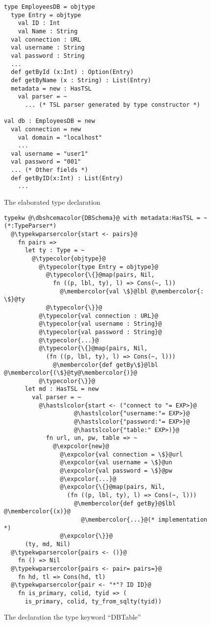 \documentclass{sig-alternate}
\newcommand{\typekwparsercolor}[1]{\textcolor[HTML]{7C803E}{#1}}
\newcommand{\expcolor}[1]{\textcolor[HTML]{FF0033}{#1}}
\newcommand{\membercolor}[1]{\textcolor[HTML]{FF6600}{#1}}
\newcommand{\typecolor}[1]{\textcolor[HTML]{660066}{#1}}
\newcommand{\hastslcolor}[1]{\textcolor[HTML]{002FC9}{#1}}
\newcommand{\dbshcemacolor}[1]{\textcolor[HTML]{5AC3D1}{#1}}
\newcommand{\mycaption}[1]{\vspace{-4px}\caption{#1}\vspace{-2px}}
\begin{document}
\begin{figure}[t]
\begin{lstlisting}[style=wyvern]
type EmployeesDB = objtype
  type Entry = objtype
    val ID : Int
    val Name : String 
  val connection : URL
  val username : String
  val password : String
  ...
  def getById (x:Int) : Option(Entry)
  def getByName (x : String) : List(Entry)
  metadata = new : HasTSL
    val parser = ~
      ... (* TSL parser generated by type constructor *)

val db : EmployeesDB = new
  val connection = new
    val domain = "localhost"
    ...
  val username = "user1"
  val password = "001"
  ... (* Other fields *)
  def getByID(x:Int) : List(Entry)
    ...
\end{lstlisting}
\mycaption{The elaborated type declaration}
\label{typekw-example-2}
\end{figure}

\begin{figure}[t]
\begin{lstlisting}[style=wyvern]
typekw @\dbshcemacolor{DBSchema}@ with metadata:HasTSL = ~ (*:TypeParser*)
  @\typekwparsercolor{start <- pairs}@
    fn pairs =>
      let ty : Type = ~
        @\typecolor{objtype}@
          @\typecolor{type Entry = objtype}@
            @\typecolor{\{}@map(pairs, Nil, 
              fn ((p, lbl, ty), l) => Cons(~, l))
                @\membercolor{val \$}@lbl @\membercolor{:  \$}@ty
            @\typecolor{\}}@
          @\typecolor{val connection : URL}@
          @\typecolor{val username : String}@
          @\typecolor{val password : String}@
          @\typecolor{...}@
          @\typecolor{\{}@map(pairs, Nil, 
            (fn ((p, lbl, ty), l) => Cons(~, l)))
              @\membercolor{def getBy\$}@lbl @\membercolor{(\$}@ty@\membercolor{)}@
          @\typecolor{\}}@
      let md : HasTSL = new 
        val parser = ~
          @\hastslcolor{start <- ("connect to "= EXP>}@
                    @\hastslcolor{"username:"= EXP>}@
                    @\hastslcolor{"password:"= EXP>}@
                    @\hastslcolor{"table:" EXP>)}@
            fn url, un, pw, table => ~
              @\expcolor{new}@ 
                @\expcolor{val connection = \$}@url
                @\expcolor{val username = \$}@un
                @\expcolor{val password = \$}@pw
                @\expcolor{...}@
                @\expcolor{\{}@map(pairs, Nil, 
                  (fn ((p, lbl, ty), l) => Cons(~, l)))
                    @\membercolor{def getBy}@$lbl @\membercolor{(x)}@ 
                      @\membercolor{...}@(* implementation *)
                @\expcolor{\}}@
      (ty, md, Nil)
  @\typekwparsercolor{pairs <- ()}@
    fn () => Nil 
  @\typekwparsercolor{pairs <- pair= pairs=}@
    fn hd, tl => Cons(hd, tl)
  @\typekwparsercolor{pair <- "*"? ID ID}@
    fn is_primary, colid, tyid => (
      is_primary, colid, ty_from_sqlty(tyid))
\end{lstlisting}
\mycaption{The declaration the type keyword ``DBTable''}
\label{typekw-example-1}
\end{figure}
\end{document}
